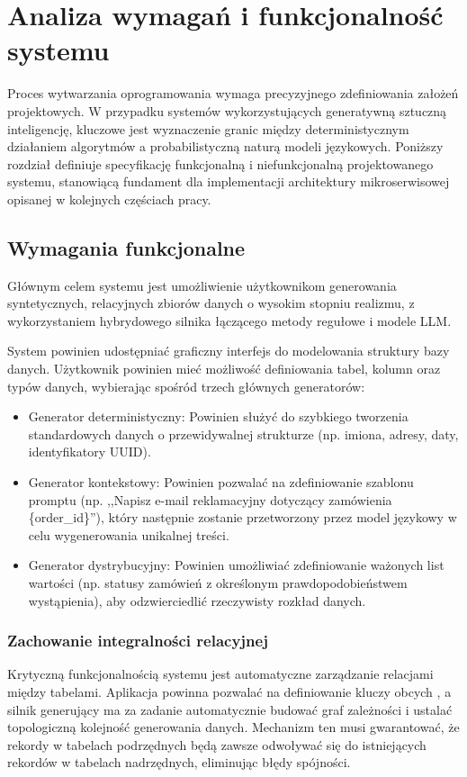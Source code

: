 \chapter{Analiza wymagań i funkcjonalność systemu}

Proces wytwarzania oprogramowania wymaga precyzyjnego zdefiniowania założeń projektowych. W przypadku systemów wykorzystujących generatywną sztuczną inteligencję, kluczowe jest wyznaczenie granic między deterministycznym działaniem algorytmów a probabilistyczną naturą modeli językowych. Poniższy rozdział definiuje specyfikację funkcjonalną i niefunkcjonalną projektowanego systemu, stanowiącą fundament dla implementacji architektury mikroserwisowej opisanej w kolejnych częściach pracy.

\section*{Wymagania funkcjonalne}
Głównym celem systemu jest umożliwienie użytkownikom generowania syntetycznych, relacyjnych zbiorów danych o wysokim stopniu realizmu, z wykorzystaniem hybrydowego silnika łączącego metody regułowe i modele \gls{LLM}.

System powinien udostępniać graficzny interfejs do modelowania struktury bazy danych. Użytkownik powinien mieć możliwość definiowania tabel, kolumn oraz typów danych, wybierając spośród trzech głównych generatorów:
\begin{itemize}
    \item Generator deterministyczny: Powinien służyć do szybkiego tworzenia standardowych danych o przewidywalnej strukturze (np. imiona, adresy, daty, identyfikatory \gls{UUID}).
    \item Generator kontekstowy: Powinien pozwalać na zdefiniowanie szablonu promptu (np. ,,Napisz e-mail reklamacyjny dotyczący zamówienia \{order\_id\}''), który następnie zostanie przetworzony przez model językowy w celu wygenerowania unikalnej treści.
    \item Generator dystrybucyjny: Powinien umożliwiać zdefiniowanie ważonych list wartości (np. statusy zamówień z określonym prawdopodobieństwem wystąpienia), aby odzwierciedlić rzeczywisty rozkład danych.
\end{itemize}

\subsection*{Zachowanie integralności relacyjnej \cite{referential_integrity}}
Krytyczną funkcjonalnością systemu jest automatyczne zarządzanie relacjami między tabelami. Aplikacja powinna pozwalać na definiowanie kluczy obcych \cite{foreign_key}, a silnik generujący ma za zadanie automatycznie budować graf zależności i ustalać topologiczną kolejność generowania danych. Mechanizm ten musi gwarantować, że rekordy w tabelach podrzędnych będą zawsze odwoływać się do istniejących rekordów w tabelach nadrzędnych, eliminując błędy spójności.

